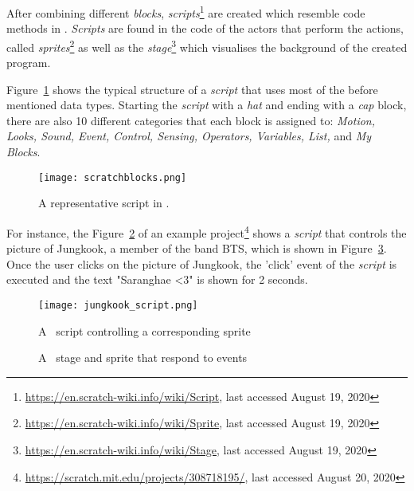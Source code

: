 After combining different \textit{blocks}, \textit{scripts}\footnote{\url{https://en.scratch-wiki.info/wiki/Script}, last accessed August 19, 2020} are created which resemble code methods in \java{}. \textit{Scripts} are found in the code of the actors that perform the actions, called \textit{sprites}\footnote{\url{https://en.scratch-wiki.info/wiki/Sprite}, last accessed August 19, 2020} as well as the \textit{stage}\footnote{\url{https://en.scratch-wiki.info/wiki/Stage}, last accessed August 19, 2020} which visualises the background of the created program. 

Figure~\ref{fig:scratchblocks} shows the typical structure of a \scratch{} \textit{script} that uses most of the before mentioned data types. Starting the \textit{script} with a \textit{hat} and ending with a \textit{cap} block, there are also 10 different categories that each block is assigned to: \textit{Motion, Looks, Sound, Event, Control, Sensing, Operators, Variables, List,} and \textit{My Blocks}. 

\begin{figure}[t]
    \centering
    \texttt{[image: scratchblocks.png]}
    \caption[A representative \scratch\ script]{\label{fig:scratchblocks} A representative script in \scratch{}.}
\end{figure}

For instance, the Figure~\ref{fig:script} of an example \scratch{} project\footnote{\url{https://scratch.mit.edu/projects/308718195/}, last accessed August 20, 2020} shows a \textit{script} that controls the picture of Jungkook, a member of the band BTS, which is shown in Figure~\ref{fig:sprite}. Once the user clicks on the picture of Jungkook, the 'click' event of the \textit{script} is executed and the text "Saranghae <3" is shown for 2 seconds.

\begin{figure}[t]
    \centering
    \texttt{[image: jungkook\_script.png]}
    \caption[Script code controlling a sprite]{\label{fig:script} A \scratch\ script controlling a corresponding sprite}
\end{figure}

\begin{figure}%
    \centering
    \qquad
    \caption[A sprite's reaction after an executed event]{\label{fig:sprite}A \scratch\ stage and sprite that respond to events}%
\end{figure}

